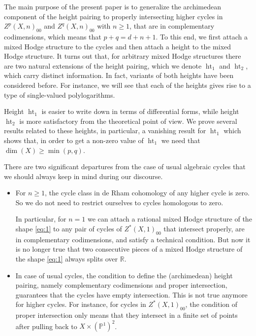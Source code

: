\documentclass[11pt,a4paper]{amsart}
\renewcommand{\P}{\mathds{P}}
\newcommand{\R}{\mathds{R}}
\DeclareMathOperator{\Ht}{ht}
\numberwithin{equation}{section}
\theoremstyle{plain}
\theoremstyle{definition}
\begin{document}
The main purpose of the present paper is to generalize the
archimedean component of the height pairing to properly intersecting
higher cycles 
in $Z^{p}(X,n)_{00}$ and $Z^{q}(X,n)_{00}$ with $n\geq 1$,
that are in complementary 
codimensions, which means that $p+q=d+n+1$.
To this end, we first attach a mixed Hodge structure to the cycles and then attach a
height to the mixed Hodge structure.  
It turns out that, for arbitrary mixed Hodge structures there are two
natural extensions of the height
pairing, which we denote  $\Ht_{1}$ and
$\Ht_{2}$, which carry distinct information. In fact,
variants of both heights 
have been considered before. For instance, we will see that each of
the heights gives rise to a type of single-valued polylogarithms.


Height $\Ht_{1}$ is easier to write down in terms of differential
forms, while height $\Ht_{2}$ is more satisfactory from the
theoretical point of view. We  
prove several results related to these heights, in
particular, a vanishing result for $\Ht_{1}$ which shows that, in
order to get a non-zero value of $\Ht_{1}$  we need that  $\dim(X)\ge
\min(p,q)$.


There are two significant departures from the case of usual algebraic cycles
that we should always keep in mind during our discourse. 
\begin{itemize}
\item
For $n\geq 1$, the cycle class in de Rham cohomology of any higher
cycle is zero. So we do not need to restrict
ourselves to cycles homologous 
to zero.

In particular, for $n=1$ we can attach a rational mixed Hodge
structure of the shape \eqref{eq:1} to any pair of cycles
of $Z^{\ast}(X,1)_{00}$ that intersect properly, are in
complementary codimensions, and satisfy a technical condition. But now
it is no longer  
true that two consecutive pieces of a mixed Hodge structure
of the shape \eqref{eq:1} always splits over $\R$.

\item
In case of usual cycles, the condition to define the (archimedean)
height pairing, namely complementary codimensions and proper
intersection, guarantees that the cycles have empty intersection. This
is not true anymore for higher cycles. For instance, for 
cycles in $Z^{\ast}(X,1)_{00}$, the condition of proper intersection only
means that they intersect in a finite set of points after pulling back
to $X\times
(\P^1)^{2}$.  
\end{itemize}
\end{document}
